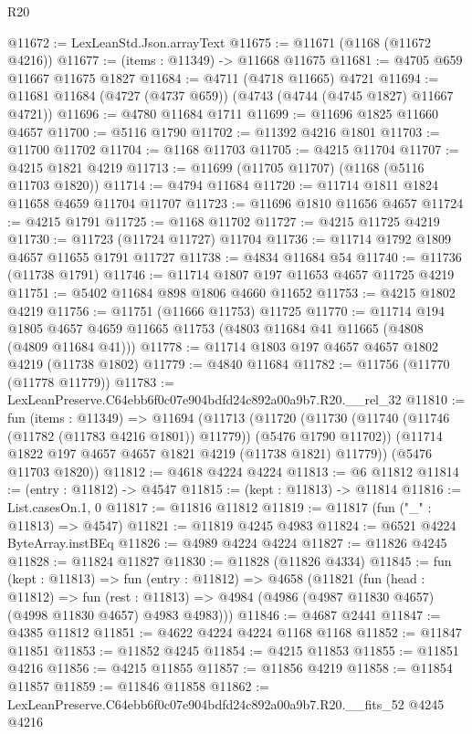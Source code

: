 \begin{lexlean}{R20}
\begin{coremodule}
@11672 := LexLeanStd.Json.arrayText
@11675 := @11671 (@1168 (@11672 @4216))
@11677 := (items : @11349) -> @11668 @11675
@11681 := @4705 @659 @11667 @11675 @1827
@11684 := @4711 (@4718 @11665) @4721
@11694 := @11681 @11684 (@4727 (@4737 @659)) (@4743 (@4744 (@4745 @1827) @11667 @4721))
@11696 := @4780 @11684 @1711
@11699 := @11696 @1825 @11660 @4657
@11700 := @5116 @1790
@11702 := @11392 @4216 @1801
@11703 := @11700 @11702
@11704 := @1168 @11703
@11705 := @4215 @11704
@11707 := @4215 @1821 @4219
@11713 := @11699 (@11705 @11707) (@1168 (@5116 @11703 @1820))
@11714 := @4794 @11684
@11720 := @11714 @1811 @1824 @11658 @4659 @11704 @11707
@11723 := @11696 @1810 @11656 @4657
@11724 := @4215 @1791
@11725 := @1168 @11702
@11727 := @4215 @11725 @4219
@11730 := @11723 (@11724 @11727) @11704
@11736 := @11714 @1792 @1809 @4657 @11655 @1791 @11727
@11738 := @4834 @11684 @54
@11740 := @11736 (@11738 @1791)
@11746 := @11714 @1807 @197 @11653 @4657 @11725 @4219
@11751 := @5402 @11684 @898 @1806 @4660 @11652
@11753 := @4215 @1802 @4219
@11756 := @11751 (@11666 @11753) @11725
@11770 := @11714
    @194
    @1805
    @4657
    @4659
    @11665
    @11753
    (@4803 @11684 @41 @11665 (@4808 (@4809 @11684 @41)))
@11778 := @11714 @1803 @197 @4657 @4657 @1802 @4219 (@11738 @1802)
@11779 := @4840 @11684
@11782 := @11756 (@11770 (@11778 @11779))
@11783 := LexLeanPreserve.C64ebb6f0c07e904bdfd24c892a00a9b7.R20.__rel_32
@11810 := fun (items : @11349) =>
  @11694
    (@11713
      (@11720
        (@11730 (@11740 (@11746 (@11782 (@11783 @4216 @1801)) @11779)) (@5476 @1790 @11702))
        (@11714 @1822 @197 @4657 @4657 @1821 @4219 (@11738 @1821) @11779))
      (@5476 @11703 @1820))
@11812 := @4618 @4224 @4224
@11813 := @6 @11812
@11814 := (entry : @11812) -> @4547
@11815 := (kept : @11813) -> @11814
@11816 := List.casesOn.{1, 0}
@11817 := @11816 @11812
@11819 := @11817 (fun ("_" : @11813) => @4547)
@11821 := @11819 @4245 @4983
@11824 := @6521 @4224 ByteArray.instBEq
@11826 := @4989 @4224 @4224
@11827 := @11826 @4245
@11828 := @11824 @11827
@11830 := @11828 (@11826 @4334)
@11845 := fun (kept : @11813) =>
  fun (entry : @11812) =>
  @4658
    (@11821
      (fun (head : @11812) =>
      fun (rest : @11813) => @4984 (@4986 (@4987 @11830 @4657) (@4998 @11830 @4657) @4983 @4983)))
@11846 := @4687 @2441
@11847 := @4385 @11812
@11851 := @4622 @4224 @4224 @1168 @1168
@11852 := @11847 @11851
@11853 := @11852 @4245
@11854 := @4215 @11853
@11855 := @11851 @4216
@11856 := @4215 @11855
@11857 := @11856 @4219
@11858 := @11854 @11857
@11859 := @11846 @11858
@11862 := LexLeanPreserve.C64ebb6f0c07e904bdfd24c892a00a9b7.R20.__fits_52 @4245 @4216

\end{coremodule}
\end{lexlean}
